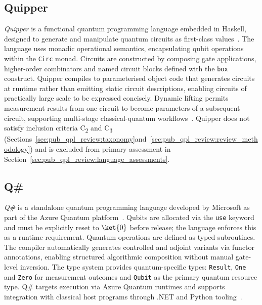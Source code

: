 \subsection{Quipper}\label{subsec:pub_qpl_review:language_descriptions:quipper}
\textit{Quipper} is a functional quantum programming language embedded in Haskell, designed to generate and manipulate quantum circuits as first-class values~\cite{green2013quipper}.
The language uses monadic operational semantics, encapsulating qubit operations within the \texttt{Circ} monad.
Circuits are constructed by composing gate applications, higher-order combinators and named circuit blocks defined with the \texttt{box} construct.
Quipper compiles to parameterised object code that generates circuits at runtime rather than emitting static circuit descriptions, enabling circuits of practically large scale to be expressed concisely.
Dynamic lifting permits measurement results from one circuit to become parameters of a subsequent circuit, supporting multi-stage classical-quantum workflows~\cite{green2013quipper}.
Quipper does not satisfy inclusion criteria C\textsubscript{2} and C\textsubscript{3} (Sections~\ref{sec:pub_qpl_review:taxonomy}and~\ref{sec:pub_qpl_review:review_methodology}) and is excluded from primary assessment in Section~\ref{sec:pub_qpl_review:language_assessments}.

\subsection{Q\#}\label{subsec:pub_qpl_review:language_descriptions:qsharp}
\textit{Q\#} is a standalone quantum programming language developed by Microsoft as part of the Azure Quantum platform~\cite{MicrosoftQSharpOverview}.
Qubits are allocated via the \texttt{use} keyword and must be explicitly reset to $\ket{0}$ before release; the language enforces this as a runtime requirement.
Quantum operations are defined as typed subroutines.
The compiler automatically generates controlled and adjoint variants via functor annotations, enabling structured algorithmic composition without manual gate-level inversion.
The type system provides quantum-specific types: \texttt{Result}, \texttt{One} and \texttt{Zero} for measurement outcomes and \texttt{Qubit} as the primary quantum resource type.
Q\# targets execution via Azure Quantum runtimes and supports integration with classical host programs through .NET and Python tooling~\cite{MicrosoftQSharpOverview}.

